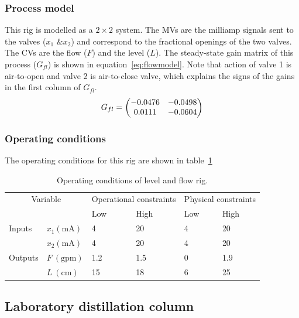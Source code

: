 \subsubsection{Process model}
This rig is modelled as a $2\times2$ system.
The MVs are the milliamp signals sent to the valves ($x_1\text{ \& }x_2$) and correspond to the fractional openings of the two valves.
The CVs are the flow ($F$) and the level ($L$).
The steady-state gain matrix of this process ($G_{fl}$) is shown in equation~\ref{eq:flowmodel}.
Note that action of valve 1 is air-to-open and valve 2 is air-to-close valve, which explains the signs of the gains in the first column of $G_{fl}$.
\begin{equation}
  \label{eq:flowmodel}
    G_{fl} = \bpm -0.0476 & -0.0498 \\      %
                  0.0111 & -0.0604 \\ \epm %
\end{equation}
\subsubsection{Operating conditions}
The operating conditions for this rig are shown in table~\ref{tab:flowopcon}
\begin{table}[htbp]
  \centering
  \begin{tabular}{llllll}
    \toprule
    \multicolumn{2}{c}{Variable} & \multicolumn{2}{c}{Operational constraints} & \multicolumn{2}{c}{Physical constraints} \\
    && Low & High & Low & High \\ 
    \midrule
    Inputs &$x_1 (\text{mA})$ & 4 & 20 & 4 & 20 \\
           &$x_2 (\text{mA})$ & 4 & 20 & 4 & 20 \\[1.3ex]
    Outputs &$F~(\text{gpm})$ & 1.2 & 1.5 & 0 & 1.9 \\
            &$L~(\text{cm})$  & 15 & 18 & 6 & 25 \\
    \bottomrule
  \end{tabular}
  \caption{Operating conditions of level and flow rig.}
  \label{tab:flowopcon}
\end{table}

\subsection{Laboratory distillation column}
